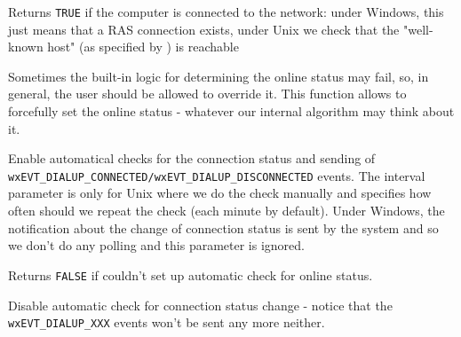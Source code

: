 \label{wxdialupmanagerisonline}


Returns {\tt TRUE} if the computer is connected to the network: under Windows,
this just means that a RAS connection exists, under Unix we check that
the "well-known host" (as specified by 
) is reachable

\label{wxdialupmanagersetonlinestatus}


Sometimes the built-in logic for determining the online status may fail,
so, in general, the user should be allowed to override it. This function
allows to forcefully set the online status - whatever our internal
algorithm may think about it.



\label{wxdialupmanagerenableautocheckonlinestatus}


Enable automatical checks for the connection status and sending of 
{\tt wxEVT\_DIALUP\_CONNECTED/wxEVT\_DIALUP\_DISCONNECTED} events. The interval
parameter is only for Unix where we do the check manually and specifies how
often should we repeat the check (each minute by default). Under Windows, the
notification about the change of connection status is sent by the system and so
we don't do any polling and this parameter is ignored.

Returns {\tt FALSE} if couldn't set up automatic check for online status.

\label{wxdialupmanagerdisableautocheckonlinestatus}


Disable automatic check for connection status change - notice that the
{\tt wxEVT\_DIALUP\_XXX} events won't be sent any more neither.

\label{wxdialupmanagersetwellknownhost}


